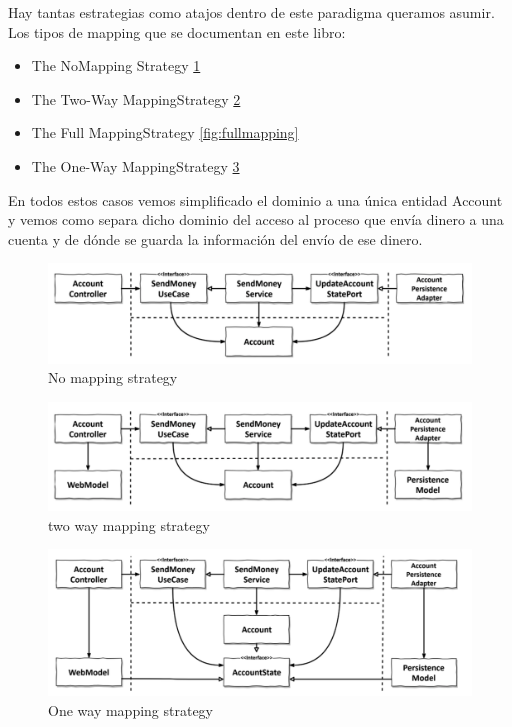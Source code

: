 Hay tantas estrategias como atajos dentro de este paradigma queramos asumir. Los tipos de mapping que se documentan en este libro:

\begin{itemize}
    \item The NoMapping Strategy \ref{fig:nomapping}
    \item The Two-Way MappingStrategy \ref{fig:twowaymapping}
    \item The Full MappingStrategy \ref{fig:fullmapping}
    \item The One-Way MappingStrategy \ref{fig:onWaymapping}
\end{itemize}

En todos estos casos vemos simplificado el dominio a una única entidad Account y vemos como separa dicho dominio del acceso al proceso que envía dinero a una cuenta y de dónde se guarda la información del envío de ese dinero.

\begin{figure}[H]
    \centering
    \includegraphics[height=0.1\textheight]{./part/Ejecucion/Seguimiento/CreateTaskUseCase/img/nomapping}
    \caption{No mapping strategy \cite{TomHombergs2019GYHD}}\label{fig:nomapping}
\end{figure}

\begin{figure}[H]
    \centering
    \includegraphics[height=0.1\textheight]{./part/Ejecucion/Seguimiento/CreateTaskUseCase/img/twowaymapping}
    \caption{two way mapping strategy \cite{TomHombergs2019GYHD}}\label{fig:twowaymapping}
\end{figure}

\begin{figure}[H]
    \centering
    \includegraphics[height=0.1\textheight]{./part/Ejecucion/Seguimiento/CreateTaskUseCase/img/onWaymapping}
    \caption{One way mapping strategy \cite{TomHombergs2019GYHD}}\label{fig:onWaymapping}
\end{figure}

